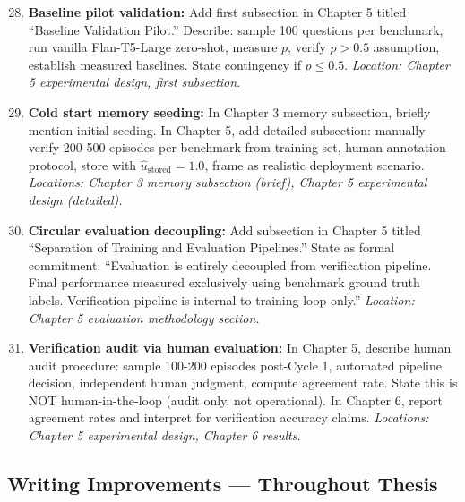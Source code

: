 \documentclass[11pt,a4paper]{article}
\newcommand{\ustored}{\hat{u}_{\text{stored}}}
\begin{document}
\begin{enumerate}
\setcounter{enumi}{27}
\item \textbf{Baseline pilot validation:} Add first subsection in Chapter 5 titled ``Baseline Validation Pilot.'' Describe: sample 100 questions per benchmark, run vanilla Flan-T5-Large zero-shot, measure $p$, verify $p > 0.5$ assumption, establish measured baselines. State contingency if $p \leq 0.5$. \textit{Location: Chapter 5 experimental design, first subsection.}

\item \textbf{Cold start memory seeding:} In Chapter 3 memory subsection, briefly mention initial seeding. In Chapter 5, add detailed subsection: manually verify 200-500 episodes per benchmark from training set, human annotation protocol, store with $\ustored = 1.0$, frame as realistic deployment scenario. \textit{Locations: Chapter 3 memory subsection (brief), Chapter 5 experimental design (detailed).}

\item \textbf{Circular evaluation decoupling:} Add subsection in Chapter 5 titled ``Separation of Training and Evaluation Pipelines.'' State as formal commitment: ``Evaluation is entirely decoupled from verification pipeline. Final performance measured exclusively using benchmark ground truth labels. Verification pipeline is internal to training loop only.'' \textit{Location: Chapter 5 evaluation methodology section.}

\item \textbf{Verification audit via human evaluation:} In Chapter 5, describe human audit procedure: sample 100-200 episodes post-Cycle 1, automated pipeline decision, independent human judgment, compute agreement rate. State this is NOT human-in-the-loop (audit only, not operational). In Chapter 6, report agreement rates and interpret for verification accuracy claims. \textit{Locations: Chapter 5 experimental design, Chapter 6 results.}
\end{enumerate}

\subsection{Writing Improvements — Throughout Thesis}
\end{document}
